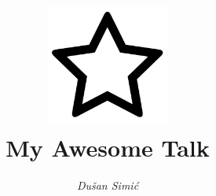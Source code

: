 \title{\includegraphics[width=0.3\textwidth]{src/graphics/logo.png}
  \vspace{-.5em}
  \\
  My Awesome Talk}
\subtitle{}
\author{\textit{Dušan Simić}}
\date{} %
\newcommand{\emailaddress}{dusan.simic1810@gmail.com}
